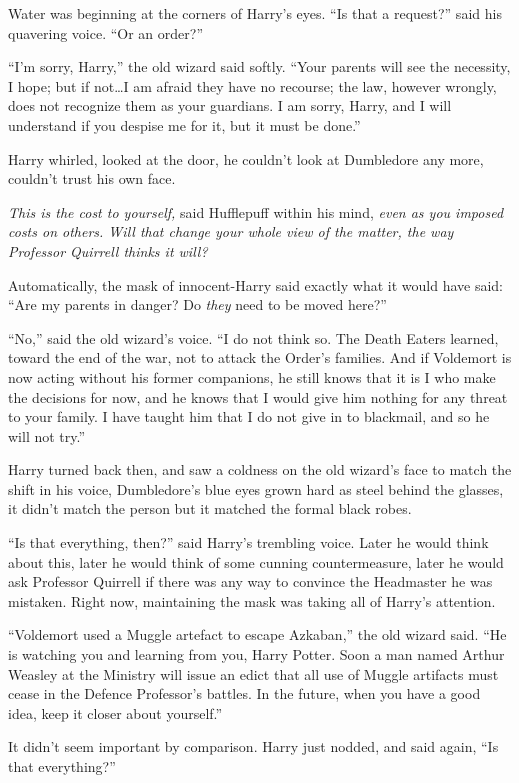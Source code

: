 Water was beginning at the corners of Harry’s eyes. “Is that a request?” said his quavering voice. “Or an order?”

“I’m sorry, Harry,” the old wizard said softly. “Your parents will see the necessity, I hope; but if not…I am afraid they have no recourse; the law, however wrongly, does not recognize them as your guardians. I am sorry, Harry, and I will understand if you despise me for it, but it must be done.”

Harry whirled, looked at the door, he couldn’t look at Dumbledore any more, couldn’t trust his own face.

\emph{This is the cost to yourself,} said Hufflepuff within his mind, \emph{even as you imposed costs on others. Will that change your whole view of the matter, the way Professor Quirrell thinks it will?}

Automatically, the mask of innocent-Harry said exactly what it would have said: “Are my parents in danger? Do \emph{they} need to be moved here?”

“No,” said the old wizard’s voice. “I do not think so. The Death Eaters learned, toward the end of the war, not to attack the Order’s families. And if Voldemort is now acting without his former companions, he still knows that it is I who make the decisions for now, and he knows that I would give him nothing for any threat to your family. I have taught him that I do not give in to blackmail, and so he will not try.”

Harry turned back then, and saw a coldness on the old wizard’s face to match the shift in his voice, Dumbledore’s blue eyes grown hard as steel behind the glasses, it didn’t match the person but it matched the formal black robes.

“Is that everything, then?” said Harry’s trembling voice. Later he would think about this, later he would think of some cunning countermeasure, later he would ask Professor Quirrell if there was any way to convince the Headmaster he was mistaken. Right now, maintaining the mask was taking all of Harry’s attention.

“Voldemort used a Muggle artefact to escape Azkaban,” the old wizard said. “He is watching you and learning from you, Harry Potter. Soon a man named Arthur Weasley at the Ministry will issue an edict that all use of Muggle artifacts must cease in the Defence Professor’s battles. In the future, when you have a good idea, keep it closer about yourself.”

It didn’t seem important by comparison. Harry just nodded, and said again, “Is that everything?”

